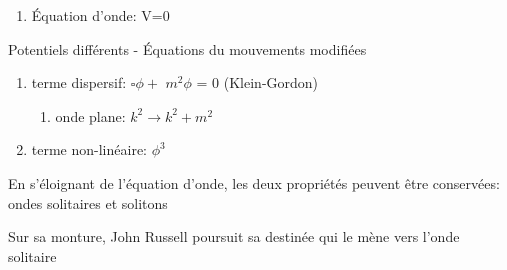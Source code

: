 \documentclass[handout]{beamer}
\begin{document}
\begin{frame}
\begin{enumerate}
\item Équation d'onde: V=0
\end{enumerate}

\begin{block}{Potentiels différents - Équations du mouvements modifiées}
\begin{enumerate}

\item terme dispersif: $\square\phi +$ \boldmath $m^2 \phi $ \unboldmath  = 0 (Klein-Gordon)\\
\begin{enumerate}
\item onde plane: $k^2 \rightarrow k^2+m^2$

\end{enumerate}
\item terme non-linéaire: $\phi^3$ \\
\end{enumerate}
\end{block}
En s'éloignant de l'équation d'onde, les deux propriétés peuvent être conservées: ondes solitaires et solitons 

\end{frame}

\begin{frame}
Sur sa monture, John Russell poursuit sa destinée qui le mène vers l'onde solitaire
\begin{columns}
    \begin{column}{.5\linewidth}
   \begin{figure}[0.3\textwidth]
    \end{figure}
    \end{column}
    \begin{column}{.5\linewidth}
    \begin{figure}[0.3\textwidth]
    \end{figure}
    \end{column}
  \end{columns}
\end{frame}
\end{document}
